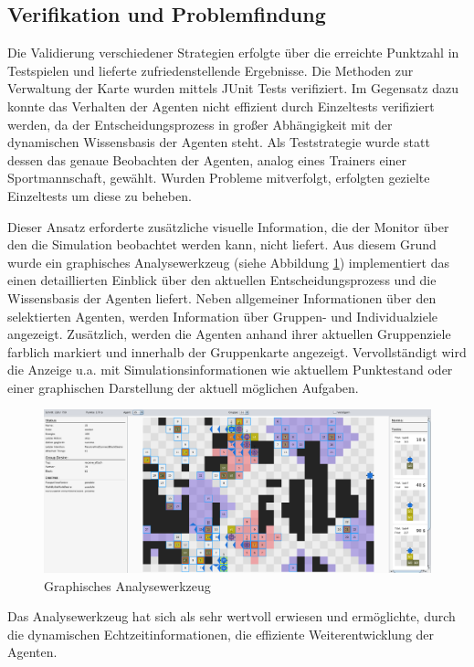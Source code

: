 \documentclass[runningheads]{llncs}
\begin{document}
\subsection{Verifikation und Problemfindung}\label{verifikation}
Die Validierung verschiedener Strategien erfolgte über die erreichte Punktzahl in Testspielen und lieferte zufriedenstellende Ergebnisse. Die Methoden zur Verwaltung der Karte wurden mittels JUnit Tests \cite{JUnit} verifiziert. Im Gegensatz dazu konnte das Verhalten der Agenten nicht effizient durch Einzeltests verifiziert werden, da der Entscheidungsprozess in großer Abhängigkeit mit der dynamischen Wissensbasis der Agenten steht.
Als Teststrategie wurde statt dessen das genaue Beobachten der Agenten, analog eines Trainers einer Sportmannschaft, gewählt. Wurden Probleme mitverfolgt, erfolgten gezielte Einzeltests um diese zu beheben.

Dieser Ansatz erforderte zusätzliche visuelle Information, die der Monitor über den die Simulation beobachtet werden kann, nicht liefert. Aus diesem Grund wurde ein graphisches Analysewerkzeug (siehe Abbildung \ref{debugger}) implementiert das einen detaillierten Einblick über den aktuellen Entscheidungsprozess und die Wissensbasis der Agenten liefert. Neben allgemeiner Informationen über den selektierten Agenten, werden Information über Gruppen- und Individualziele angezeigt. Zusätzlich, werden die Agenten anhand ihrer aktuellen Gruppenziele farblich markiert und innerhalb der Gruppenkarte angezeigt.
Vervollständigt wird die Anzeige u.a. mit Simulationsinformationen wie aktuellem Punktestand oder einer graphischen Darstellung der aktuell möglichen Aufgaben.


\begin{figure}
\includegraphics[scale=0.091]{./Referenzen/Debugger2.png}
\caption{Graphisches Analysewerkzeug}
\label{debugger}
\end{figure}

Das Analysewerkzeug hat sich als sehr wertvoll erwiesen und ermöglichte, durch die dynamischen Echtzeitinformationen, die effiziente Weiterentwicklung der Agenten.
\end{document}

